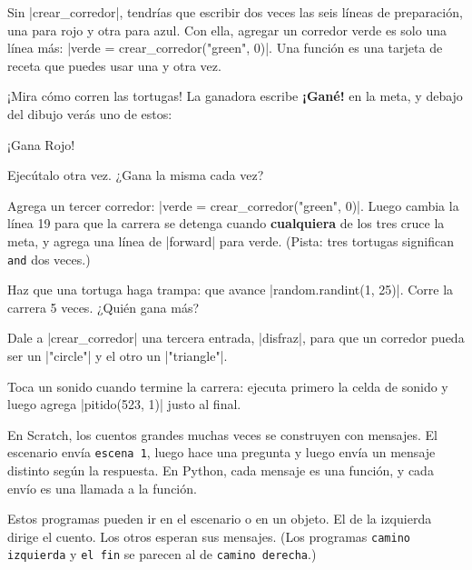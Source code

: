 \begin{think}
Sin \py|crear_corredor|, tendrías que escribir dos veces las seis líneas de preparación, una para rojo y otra para azul. Con ella, agregar un corredor verde es solo una línea más: \py|verde = crear_corredor("green", 0)|. Una función es una tarjeta de receta que puedes usar una y otra vez.
\end{think}

¡Mira cómo corren las tortugas! La ganadora escribe \textbf{¡Gané!} en la meta, y debajo del dibujo verás uno de estos:

\begin{outputbox}
¡Gana Rojo!
\end{outputbox}

Ejecútalo otra vez. ¿Gana la misma cada vez?

\begin{challenge}
\tick Agrega un tercer corredor: \py|verde = crear_corredor("green", 0)|. Luego cambia la línea 19 para que la carrera se detenga cuando \textbf{cualquiera} de los tres cruce la meta, y agrega una línea de \py|forward| para verde. (Pista: tres tortugas significan \texttt{and} dos veces.)\par
\tick Haz que una tortuga haga trampa: que avance \py|random.randint(1, 25)|. Corre la carrera 5 veces. ¿Quién gana más?\par
\tick Dale a \py|crear_corredor| una tercera entrada, \py|disfraz|, para que un corredor pueda ser un \py|"circle"| y el otro un \py|"triangle"|.\par
\tick Toca un sonido cuando termine la carrera: ejecuta primero la celda de sonido y luego agrega \py|pitido(523, 1)| justo al final.
\end{challenge}


En Scratch, los cuentos grandes muchas veces se construyen con mensajes. El escenario envía \texttt{escena 1}, luego hace una pregunta y luego envía un mensaje distinto según la respuesta. En Python, cada mensaje es una función, y cada envío es una llamada a la función.

Estos programas pueden ir en el escenario o en un objeto. El de la izquierda dirige el cuento. Los otros esperan sus mensajes. (Los programas \texttt{camino izquierda} y \texttt{el fin} se parecen al de \texttt{camino derecha}.)

